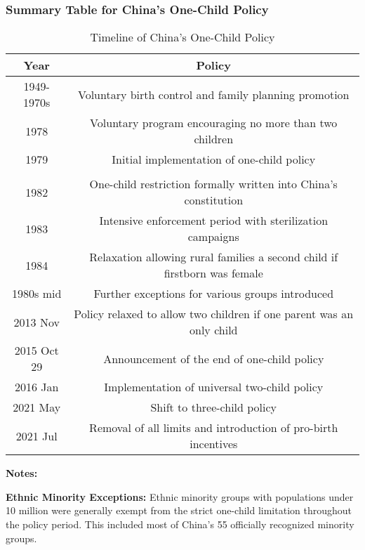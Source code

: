\documentclass[12pt,english]{article}
\begin{document}
	\subsubsection*{Summary Table for China's One-Child Policy}
	\begin{table}[H]
		\centering
		\caption{Timeline of China's One-Child Policy}
		\begin{tabular}{c|c}
			\toprule
			\textbf{Year} & \textbf{Policy} \\
			\midrule
			1949-1970s & Voluntary birth control and family planning promotion \\
			\midrule
			1978 & Voluntary program encouraging no more than two children \\
			\midrule
			1979 & Initial implementation of one-child policy \\
			\midrule
			\color{blue}{1980 Sep 25} & \color{blue}{Official nationwide standardization of one-child policy} \\
			\midrule
			1982 & One-child restriction formally written into China's constitution \\
			\midrule
			1983 & Intensive enforcement period with sterilization campaigns \\
			\midrule
			1984 & Relaxation allowing rural families a second child if firstborn was female \\
			\midrule
			1980s mid & Further exceptions for various groups introduced \\
			\midrule
			2013 Nov & Policy relaxed to allow two children if one parent was an only child \\
			\midrule
			{\color{red}2015 Oct 29} & {\color{red}Announcement of the end of one-child policy}\\
			\midrule
			2016 Jan & Implementation of universal two-child policy \\
			\midrule
			2021 May & Shift to three-child policy \\
			\midrule
			2021 Jul & Removal of all limits and introduction of pro-birth incentives \\
			\bottomrule
		\end{tabular}
	\end{table}
	
	\textbf{Notes:}
	
	\textbf{Ethnic Minority Exceptions:} Ethnic minority groups with populations under 10 million were generally exempt from the strict one-child limitation throughout the policy period. This included most of China's 55 officially recognized minority groups.
	
\end{document}
